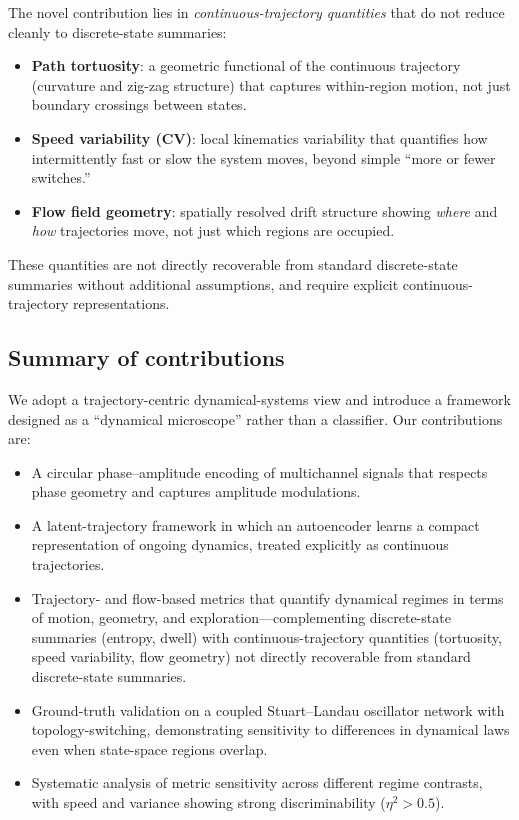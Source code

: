 \documentclass[5p,twocolumn,authoryear]{elsarticle}
\begin{document}
The novel contribution lies in \emph{continuous-trajectory quantities} that do not reduce cleanly to discrete-state summaries:
\begin{itemize}
    \item \textbf{Path tortuosity}: a geometric functional of the continuous trajectory (curvature and zig-zag structure) that captures within-region motion, not just boundary crossings between states.
    \item \textbf{Speed variability (CV)}: local kinematics variability that quantifies how intermittently fast or slow the system moves, beyond simple ``more or fewer switches.''
    \item \textbf{Flow field geometry}: spatially resolved drift structure showing \emph{where} and \emph{how} trajectories move, not just which regions are occupied.
\end{itemize}
These quantities are not directly recoverable from standard discrete-state summaries without additional assumptions, and require explicit continuous-trajectory representations.

\subsection{Summary of contributions}

We adopt a trajectory-centric dynamical-systems view and introduce a framework designed as a ``dynamical microscope'' rather than a classifier. Our contributions are:
\begin{itemize}
    \item A circular phase--amplitude encoding of multichannel signals that respects phase geometry and captures amplitude modulations.
    \item A latent-trajectory framework in which an autoencoder learns a compact representation of ongoing dynamics, treated explicitly as continuous trajectories.
    \item Trajectory- and flow-based metrics that quantify dynamical regimes in terms of motion, geometry, and exploration---complementing discrete-state summaries (entropy, dwell) with continuous-trajectory quantities (tortuosity, speed variability, flow geometry) not directly recoverable from standard discrete-state summaries.
    \item Ground-truth validation on a coupled Stuart--Landau oscillator network with topology-switching, demonstrating sensitivity to differences in dynamical laws even when state-space regions overlap.
    \item Systematic analysis of metric sensitivity across different regime contrasts, with speed and variance showing strong discriminability ($\eta^2 > 0.5$).
\end{itemize}
\end{document}
